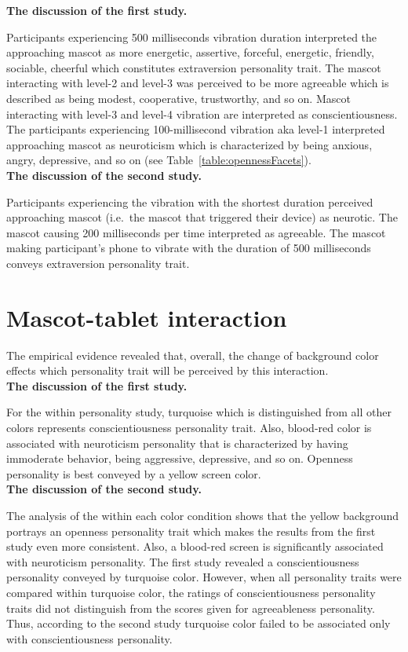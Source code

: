 \textbf{The discussion of the first study.}\par
Participants experiencing 500 milliseconds vibration duration interpreted the approaching mascot as more
energetic, assertive, forceful, energetic, friendly, sociable, cheerful which
constitutes extraversion personality trait.
The mascot interacting with level-2 and level-3 was perceived to be more agreeable which
is described as being modest, cooperative, trustworthy, and so on.
Mascot interacting with level-3 and level-4 vibration are interpreted as conscientiousness.
The participants experiencing 100-millisecond vibration aka level-1 interpreted
approaching mascot as neuroticism which is characterized by being
anxious, angry, depressive, and so on (see Table~\ref{table:opennessFacets}).\\

\textbf{The discussion of the second study.}\par
Participants experiencing the vibration with the shortest duration
perceived approaching mascot (i.e.\ the mascot that triggered their device) as neurotic.
The mascot causing 200 milliseconds per time interpreted as agreeable.
The mascot making participant's phone to vibrate with the duration of 500
milliseconds conveys extraversion personality trait.\\

\section{Mascot-tablet interaction}
\label{sec:mascot-tablet-interaction}
The empirical evidence revealed that, overall, the change of background
color effects which personality trait will be perceived by this interaction.\\

\textbf{The discussion of the first study.}\par
For the within personality study, turquoise which is distinguished from all other
colors represents conscientiousness personality trait.
Also, blood-red color is associated with neuroticism personality that is characterized by
having immoderate behavior, being aggressive, depressive, and so on.
Openness personality is best conveyed by a yellow screen color.\\

\textbf{The discussion of the second study.}\par
The analysis of the within each color condition shows that the yellow background portrays an openness
personality trait which makes the results from the first study even more consistent.
Also, a blood-red screen is significantly associated with neuroticism personality.
The first study revealed a conscientiousness personality conveyed by turquoise color.
However, when all personality traits were compared within turquoise color, the ratings
of conscientiousness personality traits did not distinguish from the scores given for
agreeableness personality.
Thus, according to the second study turquoise color failed to be associated only with conscientiousness personality.

